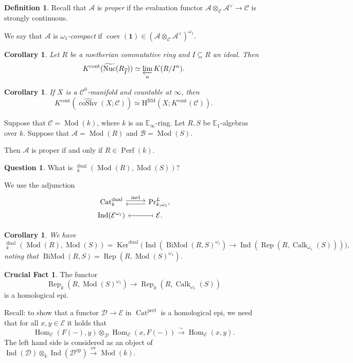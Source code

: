 \documentclass[draft]{amsart}
\newcommand{\EE}{\mathbb{E}}
\renewcommand{\H}{\mathrm{H}}
\newcommand{\ul}[1]{\underline{#1}}
\newcommand{\wh}[1]{\widehat{#1}}
\newcommand{\wt}[1]{\widetilde{#1}}
\newcommand{\cat}[1]{\mathcal{#1}}
\newcommand{\op}{\mathrm{op}}
\newcommand{\isoto}{\mathbin{\xrightarrow{\sim}}}
\renewcommand{\Pr}{\mathrm{Pr}}
\newcommand{\blank}{-} %
\newcommand{\one}{\mathbf{1}}
\DeclareMathOperator{\Hom}{Hom}
\DeclareMathOperator{\iHom}{\ul{Hom}}
\DeclareMathOperator{\coShv}{coShv}
\DeclareMathOperator{\Ind}{Ind}
\DeclareMathOperator{\Nuc}{Nuc}
\DeclareMathOperator{\Cat}{Cat}
\DeclareMathOperator{\Mod}{Mod}
\DeclareMathOperator{\Perf}{Perf}
\DeclareMathOperator{\Calk}{Calk}
\DeclareMathOperator{\BiMod}{BiMod}
\DeclareMathOperator{\Rep}{Rep}
\DeclareMathOperator{\Ker}{Ker}
\DeclareMathOperator{\coev}{coev}
\newtheorem{cor}[thm]{Corollary}
\theoremstyle{definition}
\newtheorem{defn}[thm]{Definition}
\newtheorem{question}[thm]{Question}
\newtheorem{crucialfact}[thm]{Crucial Fact}
\begin{document}
\begin{defn}
Recall that $\cat A$ is \emph{proper} if the evaluation functor $\cat A\otimes_{\cat C} \cat A^\vee \to \cat C$ is strongly continuous.

We say that $\cat A$ is \emph{$\omega_1$-compact} if $\coev(\one) \in (\cat A\otimes_{\cat C}\cat A^\vee)^{\omega_1}$.
\end{defn}

\begin{cor}
Let $R$ be a noetherian commutative ring and $I\subseteq R$ an ideal. Then
\[
K^{\mathrm{cont}}(\wt{\Nuc}(R_{\wh{I}}))\simeq \varprojlim_n K(R/I^{n}).
\]
\end{cor}

\begin{cor}
If $X$ is a ${\mathcal C}^0$-manifold and countable at $\infty$, then
\[
K^{\mathrm{cont}}(\wh{\coShv}(X;\cat C)) \simeq \H^{\mathrm{BM}}(X; K^{\mathrm{cont}}(\cat C)).
\]
\end{cor}

Suppose that $\cat C = \Mod(k)$, where $k$ is an $\EE_\infty$-ring. Let $R, S$ be $\EE_1$-algebras over $k$. Suppose that $\cat A = \Mod(R)$ and $\cat B = \Mod(S)$.

Then $\cat A$ is proper if and only if $R \in \Perf(k)$.

\begin{question}
What is $\iHom^{\mathrm{dual}}_k(\Mod(R), \Mod(S))$?
\end{question}

We use the adjunction
\[
\begin{tikzcd}[row sep=0em]
\Cat^{\mathrm{dual}}_k \ar[r,shift left,"\text{incl}"] & \ar[l,shift left] \Pr^L_{k,\omega_1}, \\
\Ind(\cat E^{\omega_1}) & \ar[l,mapsto] \cat E.
\end{tikzcd}
\]

\begin{cor}
We have 
\[
\iHom_k^{\mathrm{dual}}(\Mod(R), \Mod(S)) = \Ker^{\mathrm{dual}}\bigl( \Ind(\BiMod(R,S)^{\omega_1}) \to \Ind(\Rep(R, \Calk_{\omega_1}(S)))\bigr),
\]
noting that $\BiMod(R,S) = \Rep(R, \Mod(S)^{\omega_1})$.
\end{cor}

\begin{crucialfact}
The functor
\[
\Rep_k(R, \Mod(S)^{\omega_1}) \to \Rep_k(R, \Calk_{\omega_1}(S))
\]
is a homological epi.
\end{crucialfact}

Recall: to show that a functor $\cat D\to \cat E$ in $\Cat^{\mathrm{perf}}$ is a homological epi, we need that for all $x,y\in \cat E$ it holds that
\[
\Hom_{\cat E}(F(\blank), y) \otimes_{\cat D} \Hom_{\cat E}(x, F(\blank)) \isoto \Hom_{\cat E}(x,y).
\]
The left hand side is considered as an object of $\Ind(\cat D) \otimes_k \Ind(\cat D^\op) \xrightarrow{\mathrm{ev}} \Mod(k)$.
\end{document}
